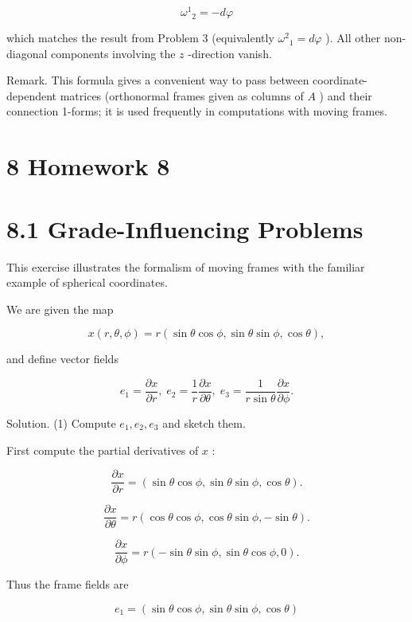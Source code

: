 \documentclass[10pt]{article}
\begin{document}
\[
{\omega }^{1}{}_{2} =  - {d\varphi }
\]

which matches the result from Problem 3 (equivalently \({\omega }^{2}{}_{1} = {d\varphi }\) ). All other non-diagonal components involving the \(z\) -direction vanish.

Remark. This formula gives a convenient way to pass between coordinate-dependent matrices (orthonormal frames given as columns of \(A\) ) and their connection 1-forms; it is used frequently in computations with moving frames.

\section*{8 Homework 8}

\section*{8.1 Grade-Influencing Problems}

\begin{problem}[title=PROBLEM 1 (8 POINTS)]
This exercise illustrates the formalism of moving frames with the familiar example of spherical coordinates.

We are given the map

\[
x\left( {r,\theta ,\phi }\right)  = r\left( {\sin \theta \cos \phi ,\sin \theta \sin \phi ,\cos \theta }\right) ,
\]

and define vector fields

\[
{e}_{1} = \frac{\partial x}{\partial r},\;{e}_{2} = \frac{1}{r}\frac{\partial x}{\partial \theta },\;{e}_{3} = \frac{1}{r\sin \theta }\frac{\partial x}{\partial \phi }.
\]
\end{problem}

Solution. (1) Compute \({e}_{1},{e}_{2},{e}_{3}\) and sketch them.

First compute the partial derivatives of \(x\) :

\[
\frac{\partial x}{\partial r} = \left( {\sin \theta \cos \phi ,\sin \theta \sin \phi ,\cos \theta }\right) .
\]

\[
\frac{\partial x}{\partial \theta } = r\left( {\cos \theta \cos \phi ,\cos \theta \sin \phi , - \sin \theta }\right) .
\]

\[
\frac{\partial x}{\partial \phi } = r\left( {-\sin \theta \sin \phi ,\sin \theta \cos \phi ,0}\right) .
\]

Thus the frame fields are

\[
{e}_{1} = \left( {\sin \theta \cos \phi ,\sin \theta \sin \phi ,\cos \theta }\right)
\]
\end{document}
